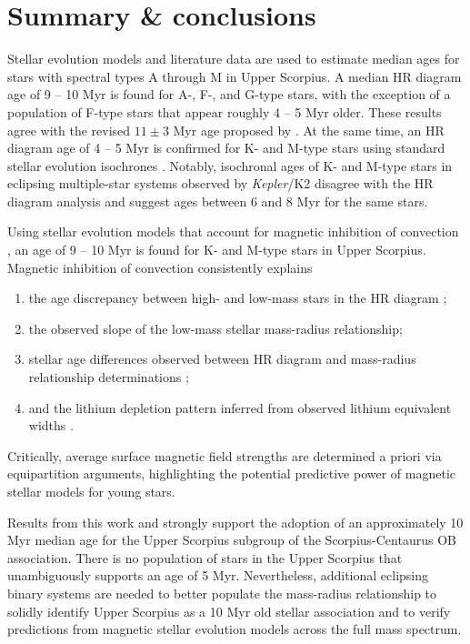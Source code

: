 \documentclass{aa}
\begin{document}
\section{Summary \& conclusions}
\label{sec:tellit}
Stellar evolution models and literature data are used to estimate median ages for stars with spectral types A through M in Upper Scorpius. A median HR diagram age of 9 -- 10 Myr is found for A-, F-, and G-type stars, with the exception of a population of F-type stars that appear roughly 4 -- 5 Myr older. These results agree with the revised $11\pm3$ Myr age proposed by \citet{Pecaut2012}. At the same time, an HR diagram age of 4 -- 5 Myr is confirmed for K- and M-type stars using standard stellar evolution isochrones \citep{Preibisch2012, Slesnick2008, Herczeg2015}. Notably, isochronal ages of K- and M-type stars in eclipsing multiple-star systems observed by \emph{Kepler}/K2 \citep{Kraus2015, Alonso2015, David2016} disagree with the HR diagram analysis and suggest ages between 6 and 8 Myr for the same stars.

Using stellar evolution models that account for magnetic inhibition of convection \citep{FC12b, FC13}, an age of 9 -- 10 Myr is found for K- and M-type stars in Upper Scorpius. Magnetic inhibition of convection consistently explains
\begin{enumerate} 
	\item the age discrepancy between high- and low-mass stars in the HR diagram \citep{Herczeg2015};
	\item the observed slope of the low-mass stellar mass-radius relationship;
	\item stellar age differences observed between HR diagram and mass-radius relationship determinations \citep{Kraus2015};
	\item and the lithium depletion pattern inferred from observed lithium equivalent widths \citep{Rizzuto2015}.
\end{enumerate}
Critically, average surface magnetic field strengths are determined a priori via equipartition arguments, highlighting the potential predictive power of magnetic stellar models for young stars.

Results from this work and \citet{Pecaut2012} strongly support the adoption of an approximately 10 Myr median age for the Upper Scorpius subgroup of the Scorpius-Centaurus OB association. There is no population of stars in the Upper Scorpius that unambiguously supports an age of 5 Myr. Nevertheless, additional eclipsing binary systems are needed to better populate the mass-radius relationship to solidly identify Upper Scorpius as a 10 Myr old stellar association and to verify predictions from magnetic stellar evolution models across the full mass spectrum.
\end{document}
